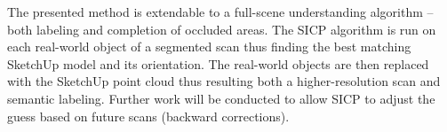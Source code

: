 \documentclass{llncs}
\begin{document}
The presented method is extendable to a full-scene understanding
algorithm -- both labeling and completion of occluded areas. The SICP
algorithm is run on each real-world object of a segmented scan thus
finding the best matching SketchUp model and its orientation. The
real-world objects are then replaced with the SketchUp point cloud
thus resulting both a higher-resolution scan and semantic
labeling. Further work will be conducted to allow SICP to adjust
the guess based on future scans (backward corrections).




\end{document}
